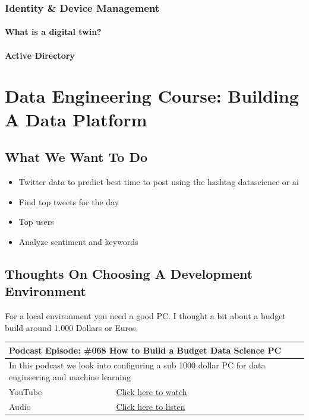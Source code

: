 \documentclass[12pt, numbers=noenddot]{scrreprt} %
\begin{document}
\section{Identity \& Device Management}

\subsection{What is a digital twin?}
\subsection{Active Directory}




\part{Data Engineering Course: Building A Data Platform}

\chapter{What We Want To Do}

\begin{itemize}
\item Twitter data to predict best time to post using the hashtag datascience or ai
\item Find top tweets for the day
\item Top users
\item Analyze sentiment and keywords
\end{itemize}


\chapter{Thoughts On Choosing A Development Environment}

For a local environment you need a good PC. I thought a bit about a budget build around 1.000 Dollars or Euros.

\begin{table}[h]
\begin{tabular}{ll}
\hline
\multicolumn{2}{l}{\textbf{Podcast Episode:} \#068 How to Build a Budget Data Science PC} \\ \hline
\multicolumn{2}{p{15cm}}{In this podcast we look into configuring a sub 1000 dollar PC for data engineering and machine learning}         \\ \hline
\multicolumn{1}{l|}{YouTube}   & \href{https://youtu.be/00NWR-II6ek}{Click here to watch}   \\
\multicolumn{1}{l|}{Audio}     & \href{https://anchor.fm/andreaskayy/episodes/068-A-Budget-Data-Science-PC-Build-e45inh}{Click here to listen}   \\ \hline
\end{tabular}
\end{table}
\end{document}
